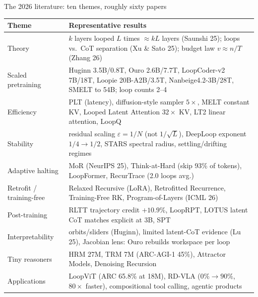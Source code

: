 \documentclass[aspectratio=169,10pt]{beamer}
\begin{document}
\begin{frame}{The 2026 literature: ten themes, roughly sixty papers}
  \vspace{4pt}
  \begin{center}
  \footnotesize
  \begin{tabular}{@{}lp{}@{}}
    \toprule
    Theme & Representative results \\
    \midrule
    Theory & $k$ layers looped $L$ times $\approx kL$ layers (Saunshi 25); loops vs.\ CoT separation (Xu \& Sato 25); budget law $v \approx n/T$ (Zhang 26) \\
    Scaled pretraining & Huginn 3.5B/0.8T, Ouro 2.6B/7.7T, LoopCoder-v2 7B/18T, Loopie 20B-A2B/3.5T, Nanbeige4.2-3B/28T, SMELT to 54B; loop counts 2--4 \\
    Efficiency & PLT (latency), diffusion-style sampler $5\times$, MELT constant KV, Looped Latent Attention $32\times$ KV, LT2 linear attention, LoopQ \\
    Stability & residual scaling $\varepsilon{=}1/N$ (not $1/\sqrt L$), DeepLoop exponent $1/4 \to 1/2$, STARS spectral radius, settling/drifting regimes \\
    Adaptive halting & MoR (NeurIPS 25), Think-at-Hard (skip 93\% of tokens), LoopFormer, RecurTrace (2.0 loops avg.) \\
    Retrofit / training-free & Relaxed Recursive (LoRA), Retrofitted Recurrence, Training-Free RK, Program-of-Layers (ICML 26) \\
    Post-training & RLTT trajectory credit $+10.9\%$, LoopRPT, LOTUS latent CoT matches explicit at 3B, SPT \\
    Interpretability & orbits/sliders (Huginn), limited latent-CoT evidence (Lu 25), Jacobian lens: Ouro rebuilds workspace per loop \\
    Tiny reasoners & HRM 27M, TRM 7M (ARC-AGI-1 45\%), Attractor Models, Denoising Recursion \\
    Applications & LoopViT (ARC 65.8\% at 18M), RD-VLA ($0\% \to 90\%$, $80\times$ faster), compositional tool calling, agentic products \\
    \bottomrule
  \end{tabular}
  \end{center}
\end{frame}
\end{document}
